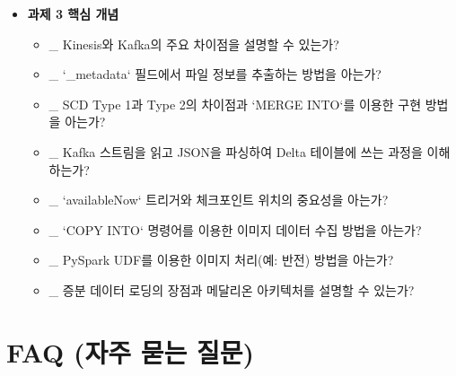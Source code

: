 \documentclass[11pt,a4paper]{article}
\begin{document}
\begin{itemize}
\begin{itemize}
        \item \_ `DISTINCT` 및 `dropDuplicates()`를 이용한 중복 제거 방법을 아는가?
        \item \_ 노트북 위젯을 이용한 쿼리 파라미터화 방법을 아는가?
        \item \_ 스트리밍의 내결함성(체크포인팅, 아이뎀포턴트 싱크)을 이해하는가?
        \item \_ 브로드캐스트 변수의 특징(불변성, 로컬 복사)을 아는가?
        \item \_ `repartition()`과 `coalesce()`의 차이점을 아는가?
        \item \_ `explode()` 함수를 이용한 배열 컬럼 처리 방법을 아는가?
        \item \_ `take()`와 `collect()`의 차이점과 주의사항을 아는가?
        \item \_ MLflow 모델 레지스트리 및 `autolog`의 목적을 아는가?
        \item \_ 하이퍼파라미터 최적화(Optuna) 및 차원 축소(PCA) 개념을 아는가?
        \item \_ 불균형 데이터셋 처리 기법(오버/언더샘플링, SMOTE)을 아는가?
    \end{itemize}
    \item \textbf{과제 3 핵심 개념}
    \begin{itemize}
        \item \_ Kinesis와 Kafka의 주요 차이점을 설명할 수 있는가?
        \item \_ `_metadata` 필드에서 파일 정보를 추출하는 방법을 아는가?
        \item \_ SCD Type 1과 Type 2의 차이점과 `MERGE INTO`를 이용한 구현 방법을 아는가?
        \item \_ Kafka 스트림을 읽고 JSON을 파싱하여 Delta 테이블에 쓰는 과정을 이해하는가?
        \item \_ `availableNow` 트리거와 체크포인트 위치의 중요성을 아는가?
        \item \_ `COPY INTO` 명령어를 이용한 이미지 데이터 수집 방법을 아는가?
        \item \_ PySpark UDF를 이용한 이미지 처리(예: 반전) 방법을 아는가?
        \item \_ 증분 데이터 로딩의 장점과 메달리온 아키텍처를 설명할 수 있는가?
    \end{itemize}
\end{itemize}

\newpage
\section*{FAQ (자주 묻는 질문)}
\end{document}
